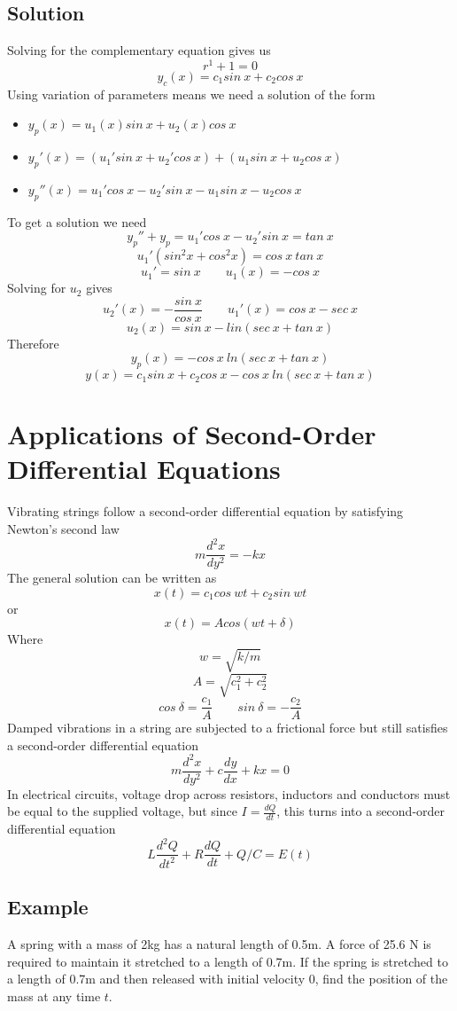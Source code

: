 \subsection*{Solution}
Solving for the complementary equation gives us
$$r^1+1=0$$
$$y_c(x)=c_1sin\:x+c_2cos\:x$$
Using variation of parameters means we need a solution of the form
\begin{itemize}
    \item[] $y_p(x)=u_1(x)sin\:x+u_2(x)cos\:x$
    \item[] $y_p'(x)=(u_1'sin\:x+u_2'cos\:x)+(u_1sin\:x+u_2cos\:x)$
    \item[] $y_p''(x)=u_1'cos\:x-u_2'sin\:x-u_1sin\:x-u_2cos\:x$
\end{itemize}
To get a solution we need
$$y_p''+y_p=u_1'cos\:x-u_2'sin\:x=tan\:x$$
$$u_1'(sin^2x+cos^2x)=cos\:x\:tan\:x$$
$$u_1'=sin\:x \qquad u_1(x)=-cos\:x$$
Solving for $u_2$ gives
$$u_2'(x)=-\frac{sin\:x}{cos\:x} \qquad u_1'(x)=cos\:x-sec\:x$$
$$u_2(x)=sin\:x-lin(sec\:x+tan\:x)$$
Therefore
$$y_p(x)=-cos\:x\:ln(sec\:x+tan\:x)$$
$$y(x)=c_1sin\:x+c_2cos\:x-cos\:x\:ln(sec\:x+tan\:x)$$

\section{Applications of Second-Order Differential Equations}

Vibrating strings follow a second-order differential equation by satisfying
Newton's second law
$$m\frac{d^2x}{dy^2}=-kx$$
The general solution can be written as
$$x(t)=c_1cos\:wt+c_2sin\:wt$$
or
$$x(t)=Acos(wt+\delta)$$
Where
$$w=\sqrt{k/m}$$
$$A=\sqrt{c_1^2+c_2^2}$$
$$cos\:\delta =\frac{c_1}{A} \qquad sin\:\delta = -\frac{c_2}{A}$$
Damped vibrations in a string are subjected to a frictional force but still satisfies
a second-order differential equation
$$m\frac{d^2x}{dy^2}+c\frac{dy}{dx}+kx=0$$
In electrical circuits, voltage drop across resistors, inductors and conductors
must be equal to the supplied voltage, but since $I = \frac{dQ}{dt}$, this turns into a
second-order differential equation
$$L\frac{d^2Q}{dt^2}+R\frac{dQ}{dt}+Q/C=E(t)$$

\subsection*{Example}
A spring with a mass of 2kg has a natural length of 0.5m. A force of 25.6 N
is required to maintain it stretched to a length of 0.7m. If the spring is
stretched to a length of 0.7m and then released with initial velocity 0, find
the position of the mass at any time $t$.

